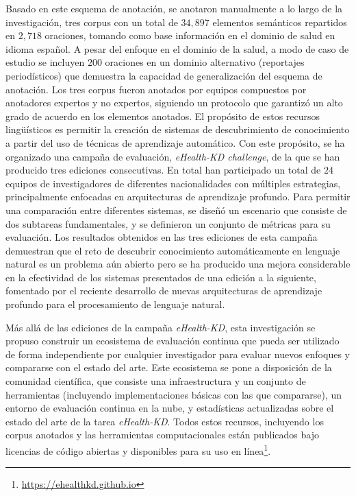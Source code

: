 Basado en este esquema de anotación, se anotaron manualmente a lo largo de la investigación, tres corpus con un total de $34,897$ elementos semánticos repartidos en $2,718$ oraciones, tomando como base información en el dominio de salud en idioma español. A pesar del enfoque en el dominio de la salud, a modo de caso de estudio se incluyen $200$ oraciones en un dominio alternativo (reportajes periodísticos) que demuestra la capacidad de generalización del esquema de anotación. Los tres corpus fueron anotados por equipos compuestos por anotadores expertos y no expertos, siguiendo un protocolo que garantizó un alto grado de acuerdo en los elementos anotados.   
El propósito de estos recursos lingüísticos es permitir la creación de sistemas de descubrimiento de conocimiento a partir del uso de técnicas de aprendizaje automático. 
Con este propósito, se ha organizado una campaña de evaluación, \textit{eHealth-KD challenge}, de la que se han producido tres ediciones consecutivas. En total han participado un total de $24$ equipos de investigadores de diferentes nacionalidades con múltiples estrategias, principalmente enfocadas en arquitecturas de aprendizaje profundo. Para permitir una comparación entre diferentes sistemas, se diseñó un escenario que consiste de dos subtareas fundamentales, y se definieron un conjunto de métricas para su evaluación.
Los resultados obtenidos en las tres ediciones de esta campaña demuestran que el reto de descubrir conocimiento automáticamente en lenguaje natural es un problema aún abierto pero se ha producido una mejora considerable en la efectividad de los sistemas presentados de una edición a la siguiente, fomentado por el reciente desarrollo de nuevas arquitecturas de aprendizaje profundo para el procesamiento de lenguaje natural.

Más allá de las ediciones de la campaña \textit{eHealth-KD}, esta investigación se propuso construir un ecosistema de evaluación continua que pueda ser utilizado de forma independiente por cualquier investigador para evaluar nuevos enfoques y compararse con el estado del arte.
Este ecosistema se pone a disposición de la comunidad científica, que consiste una infraestructura y un conjunto de herramientas (incluyendo implementaciones básicas con las que compararse), un entorno de evaluación continua en la nube, y estadísticas actualizadas sobre el estado del arte de la tarea \textit{eHealth-KD}.
Todos estos recursos, incluyendo los corpus anotados y las herramientas computacionales están publicados bajo licencias de código abiertas y disponibles para su uso en línea\footnote{\url{https://ehealthkd.github.io}}.

